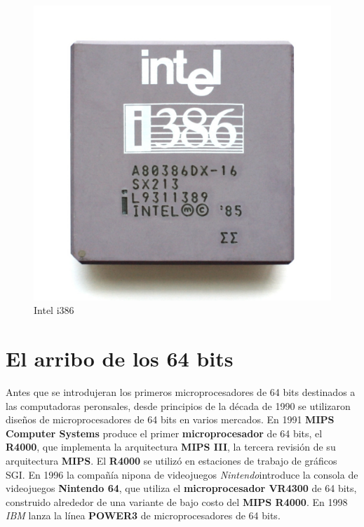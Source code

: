 \begin{figure}[htb]
	\centering
	\includegraphics[scale = 0.1]{Graphics/Intel_i386DX.jpg}
	\caption{Intel i386}
	\label{fig:18}
\end{figure}
\newpage

\section{El arribo de los 64 bits}
Antes que se introdujeran los primeros microprocesadores de 64 bits destinados a las computadoras peronsales, desde principios de la década de
1990 se utilizaron diseños de microprocesadores de 64 bits en varios mercados. En 1991 \textbf{MIPS Computer Systems} produce el primer \textbf
{microprocesador} de 64 bits, el \textbf{R4000}, que implementa la arquitectura \textbf{MIPS III}, la tercera revisión de su arquitectura \textbf{MIPS}.
El \textbf{R4000} se utilizó en estaciones de trabajo de gráficos SGI. En 1996 la compañía nipona de videojuegos \emph{Nintendo}introduce la consola de
videojuegos \textbf{Nintendo 64}, que utiliza el \textbf{microprocesador VR4300} de 64 bits, construido alrededor de una variante de bajo costo del
\textbf{MIPS R4000}. En 1998 \emph{IBM} lanza la línea \textbf{POWER3} de microprocesadores de 64 bits. 

